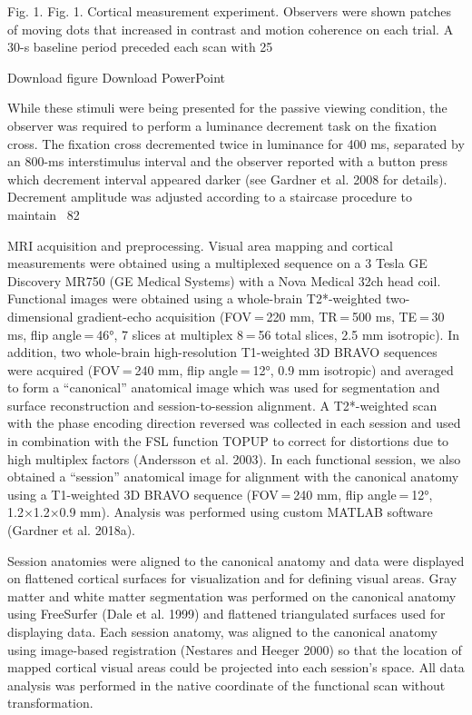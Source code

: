\documentclass{report}
\begin{document}
Fig. 1.
Fig. 1.
Cortical measurement experiment. Observers were shown patches of moving dots that increased in contrast and motion coherence on each trial. A 30-s baseline period preceded each scan with 25%

Download figure Download PowerPoint

While these stimuli were being presented for the passive viewing condition, the observer was required to perform a luminance decrement task on the fixation cross. The fixation cross decremented twice in luminance for 400 ms, separated by an 800-ms interstimulus interval and the observer reported with a button press which decrement interval appeared darker (see Gardner et al. 2008 for details). Decrement amplitude was adjusted according to a staircase procedure to maintain ~82%

MRI acquisition and preprocessing.
Visual area mapping and cortical measurements were obtained using a multiplexed sequence on a 3 Tesla GE Discovery MR750 (GE Medical Systems) with a Nova Medical 32ch head coil. Functional images were obtained using a whole-brain T2*-weighted two-dimensional gradient-echo acquisition (FOV = 220 mm, TR = 500 ms, TE = 30 ms, flip angle = 46°, 7 slices at multiplex 8 = 56 total slices, 2.5 mm isotropic). In addition, two whole-brain high-resolution T1-weighted 3D BRAVO sequences were acquired (FOV = 240 mm, flip angle = 12°, 0.9 mm isotropic) and averaged to form a “canonical” anatomical image which was used for segmentation and surface reconstruction and session-to-session alignment. A T2*-weighted scan with the phase encoding direction reversed was collected in each session and used in combination with the FSL function TOPUP to correct for distortions due to high multiplex factors (Andersson et al. 2003). In each functional session, we also obtained a “session” anatomical image for alignment with the canonical anatomy using a T1-weighted 3D BRAVO sequence (FOV = 240 mm, flip angle = 12°, 1.2×1.2×0.9 mm). Analysis was performed using custom MATLAB software (Gardner et al. 2018a).

Session anatomies were aligned to the canonical anatomy and data were displayed on flattened cortical surfaces for visualization and for defining visual areas. Gray matter and white matter segmentation was performed on the canonical anatomy using FreeSurfer (Dale et al. 1999) and flattened triangulated surfaces used for displaying data. Each session anatomy, was aligned to the canonical anatomy using image-based registration (Nestares and Heeger 2000) so that the location of mapped cortical visual areas could be projected into each session’s space. All data analysis was performed in the native coordinate of the functional scan without transformation.
\end{document}

